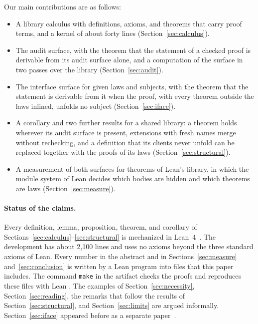 \documentclass[acmsmall,nonacm,screen]{acmart}
\newcommand{\lean}[1]{\texttt{#1}}
\begin{document}
Our main contributions are as follows:
\begin{itemize}
\item A library calculus with definitions, axioms, and theorems that carry proof terms, and a
  kernel of about forty lines (Section~\ref{sec:calculus}).
\item The audit surface, with the theorem that the statement of a checked proof is derivable from
  its audit surface alone, and a computation of the surface in two passes over the library
  (Section~\ref{sec:audit}).
\item The interface surface for given laws and subjects, with the theorem that the statement is
  derivable from it when the proof, with every theorem outside the laws inlined, unfolds no
  subject (Section~\ref{sec:iface}).
\item A corollary and two further results for a shared library: a theorem holds wherever its
  audit surface is present, extensions with fresh names merge without rechecking, and a
  definition that its clients never unfold can be replaced together with the proofs of its laws
  (Section~\ref{sec:structural}).
\item A measurement of both surfaces for \NumSample{} theorems of Lean's library, in which the
  module system of Lean decides which bodies are hidden and which theorems are laws
  (Section~\ref{sec:measure}).
\end{itemize}

\paragraph{Status of the claims.}
Every definition, lemma, proposition, theorem, and corollary of
Sections~\ref{sec:calculus}--\ref{sec:structural} is mechanized in Lean~4~\citep{moura2021}. The
development has about 2,100 lines and uses no axioms beyond the three standard axioms of Lean.
Every number in the abstract and in Sections~\ref{sec:measure} and~\ref{sec:conclusion} is
written by a Lean program into files that this paper includes. The command \lean{make} in the
artifact checks the proofs and reproduces these files with Lean \LeanVersion{}. The examples of
Section~\ref{sec:necessity}, Section~\ref{sec:reading}, the remarks that follow the results of
Section~\ref{sec:structural}, and Section~\ref{sec:limits} are argued informally.
Section~\ref{sec:iface} appeared before as a separate paper~\citep{tpp2}.

\end{document}
